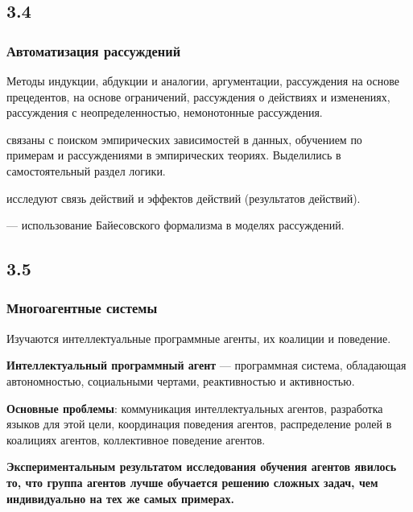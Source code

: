 \documentclass[default]{beamer}
\begin{document}
	\subsection{3.4}
	\begin{frame}
		\frametitle{Автоматизация  рассуждений}
		
		Методы индукции, абдукции и аналогии, аргументации, рассуждения на основе прецедентов, на основе ограничений, рассуждения о действиях и изменениях, рассуждения с неопределенностью, немонотонные рассуждения.
		\par\medskip
		связаны с поиском эмпирических зависимостей в данных, обучением по примерам и рассуждениями в эмпирических  теориях. Выделились в самостоятельный раздел логики.
		\par\medskip
		исследуют связь  действий и эффектов действий (результатов действий).
		\par\medskip
		--- использование  Байесовского  формализма в моделях рассуждений. 
		
	\end{frame}

	\subsection{3.5}
	\begin{frame}
		\frametitle{Многоагентные системы}
		
		Изучаются интеллектуальные программные агенты, их коалиции и поведение.
		
		\par\medskip
		\textbf{Интеллектуальный программный  агент} --- программная система, обладающая автономностью, социальными чертами, реактивностью и активностью.
		
		\par\medskip
		\textbf{Основные проблемы}: коммуникация интеллектуальных агентов, разработка языков для этой цели, координация поведения  агентов, распределение ролей в коалициях агентов, коллективное поведение агентов.
		\par\medskip
		\textbf{Экспериментальным результатом исследования обучения агентов явилось то, что группа агентов лучше обучается решению сложных задач, чем индивидуально на тех же самых примерах.}
	\end{frame}
\end{document}

